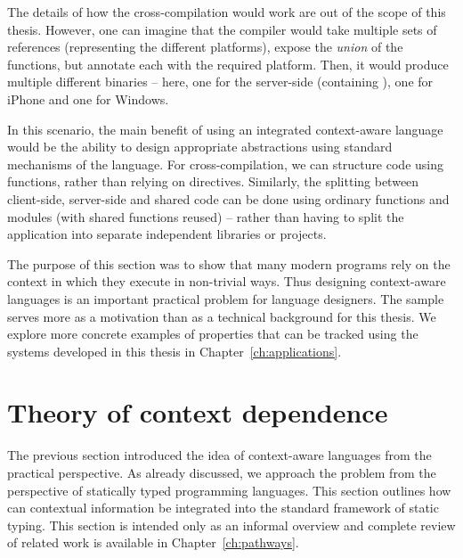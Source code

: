 The details of how the cross-compilation would work are out of the scope of this thesis. However,
one can imagine that the compiler would take multiple sets of references (representing the different
platforms), expose the \emph{union} of the functions, but annotate each with the required platform.
Then, it would produce multiple different binaries -- here, one for the server-side (containing
), one for iPhone and one for Windows.

In this scenario, the main benefit of using an integrated context-aware language would be the
ability to design appropriate abstractions using standard mechanisms of the language. For
cross-compilation, we can structure code using functions, rather than relying on 
directives. Similarly, the splitting between client-side, server-side and shared code can be
done using ordinary functions and modules (with shared functions reused) -- rather than having 
to split the application into separate independent libraries or projects.

The purpose of this section was to show that many modern programs rely on the context in which
they execute in non-trivial ways. Thus designing context-aware languages is an important
practical problem for language designers. The sample serves more as a motivation than as a
technical background for this thesis. We explore more concrete examples of properties that
can be tracked using the systems developed in this thesis in Chapter~\ref{ch:applications}.


\section{Theory of context dependence}
\label{sec:intro-theory}

The previous section introduced the idea of context-aware languages from the practical perspective.
As already discussed, we approach the problem from the perspective of statically typed programming
languages. This section outlines how can contextual information be integrated into the
standard framework of static typing. This section is intended only as an informal overview and 
complete review of related work is available in Chapter~\ref{ch:pathways}.

